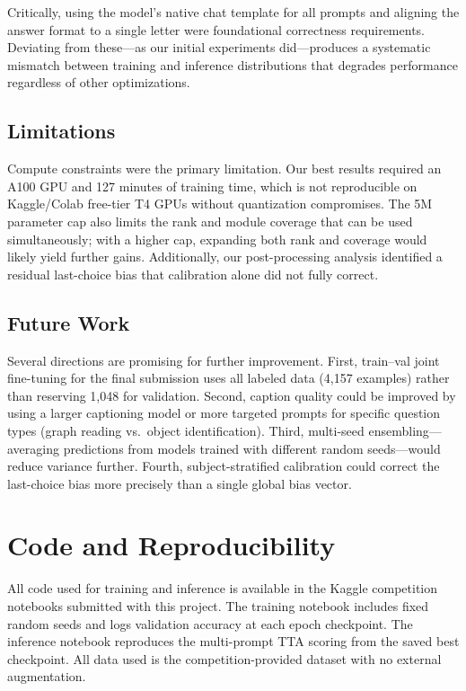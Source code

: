 \documentclass[11pt]{article}
\begin{document}
Critically, using the model's native chat template for all prompts and aligning the answer format to a single letter were foundational correctness requirements. Deviating from these---as our initial experiments did---produces a systematic mismatch between training and inference distributions that degrades performance regardless of other optimizations.

\subsection{Limitations}

Compute constraints were the primary limitation. Our best results required an A100 GPU and 127 minutes of training time, which is not reproducible on Kaggle/Colab free-tier T4 GPUs without quantization compromises. The 5M parameter cap also limits the rank and module coverage that can be used simultaneously; with a higher cap, expanding both rank and coverage would likely yield further gains. Additionally, our post-processing analysis identified a residual last-choice bias that calibration alone did not fully correct.

\subsection{Future Work}

Several directions are promising for further improvement. First, train--val joint fine-tuning for the final submission uses all labeled data (4,157 examples) rather than reserving 1,048 for validation. Second, caption quality could be improved by using a larger captioning model or more targeted prompts for specific question types (graph reading vs.\ object identification). Third, multi-seed ensembling---averaging predictions from models trained with different random seeds---would reduce variance further. Fourth, subject-stratified calibration could correct the last-choice bias more precisely than a single global bias vector.

\section{Code and Reproducibility}

All code used for training and inference is available in the Kaggle competition notebooks submitted with this project. The training notebook includes fixed random seeds and logs validation accuracy at each epoch checkpoint. The inference notebook reproduces the multi-prompt TTA scoring from the saved best checkpoint. All data used is the competition-provided dataset with no external augmentation.
\end{document}
